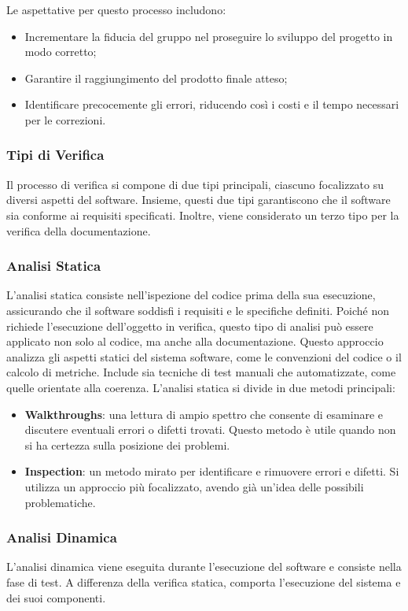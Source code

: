 Le aspettative per questo processo includono:
\begin{itemize}
    \item Incrementare la fiducia del gruppo nel proseguire lo sviluppo del progetto in modo corretto;
    \item Garantire il raggiungimento del prodotto finale atteso;
    \item Identificare precocemente gli errori, riducendo così i costi e il tempo necessari per le correzioni.
\end{itemize}

\subsubsection{Tipi di Verifica}
Il processo di verifica si compone di due tipi principali, ciascuno focalizzato su diversi aspetti del software. 
Insieme, questi due tipi garantiscono che il software sia conforme ai requisiti specificati. 
Inoltre, viene considerato un terzo tipo per la verifica della documentazione.

\subsubsection*{Analisi Statica}
L’analisi statica consiste nell’ispezione del codice prima della sua esecuzione, assicurando che il software soddisfi 
i requisiti e le specifiche definiti. Poiché non richiede l’esecuzione dell’oggetto in verifica, questo tipo di analisi 
può essere applicato non solo al codice, ma anche alla documentazione.
Questo approccio analizza gli aspetti statici del sistema software, come le convenzioni del codice o il calcolo di metriche. 
Include sia tecniche di test manuali che automatizzate, come quelle orientate alla coerenza.  
L’analisi statica si divide in due metodi principali:
\begin{itemize}
    \item \textbf{Walkthroughs}: una lettura di ampio spettro che consente di esaminare e discutere 
    eventuali errori o difetti trovati. Questo metodo è utile quando non si ha certezza sulla posizione dei problemi.
    \item \textbf{Inspection}: un metodo mirato per identificare e rimuovere errori e difetti. 
    Si utilizza un approccio più focalizzato, avendo già un'idea delle possibili problematiche.
\end{itemize}

\subsubsection*{Analisi Dinamica}
L’analisi dinamica viene eseguita durante l’esecuzione del software e consiste nella fase di test. A differenza della verifica statica, comporta l’esecuzione del sistema e dei suoi componenti.  

